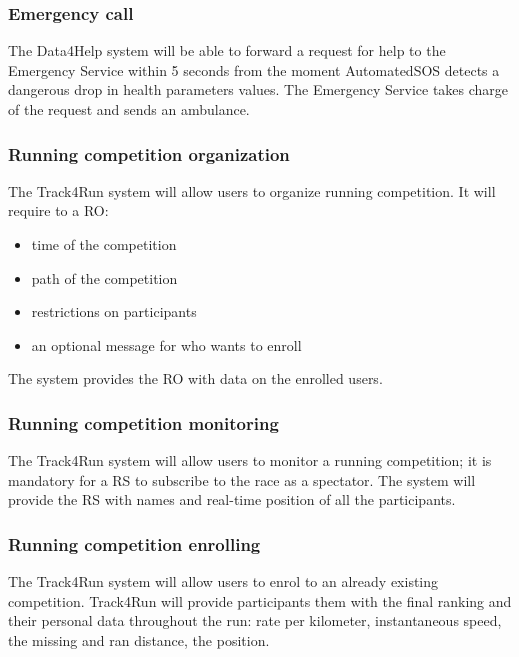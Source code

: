 \subsubsection{Emergency call}
The Data4Help system will be able to forward a request for help to the Emergency Service within 5 seconds from the moment AutomatedSOS detects a dangerous drop in health parameters values. The Emergency Service takes charge of the request and sends an ambulance. 
\\
\subsubsection{Running competition organization}
The Track4Run system will allow users to organize running competition. It will require to a RO: 
\begin{itemize}
\item time of the competition
\item path of the competition
\item restrictions on participants 
\item an optional message for who wants to enroll 
\end{itemize}
The system provides the RO with data on the enrolled users.
\subsubsection{Running competition monitoring}
The Track4Run system will allow users to monitor a running competition; it is mandatory for a RS to subscribe to the race as a spectator. The system will provide the RS with names and real-time position of all the participants.
\subsubsection{Running competition enrolling}
The Track4Run system will allow users to enrol to an already existing competition. Track4Run will provide participants them with the final ranking and their personal data throughout the run: rate per kilometer, instantaneous speed, the missing and ran distance, the position.

